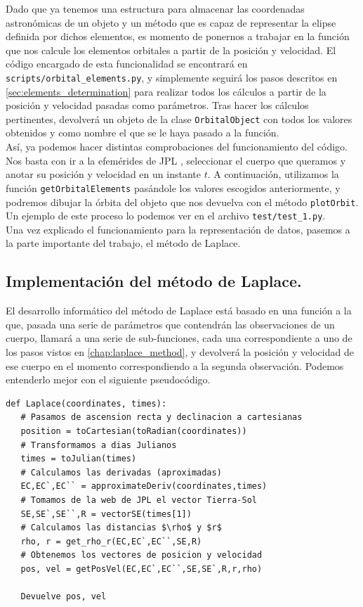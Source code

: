 \documentclass[11pt]{book}
\begin{document}
Dado que ya tenemos una estructura para almacenar las coordenadas astronómicas de un objeto y un método que es capaz de representar la elipse definida por dichos elementos, es momento de ponernos a trabajar en la función que nos calcule los elementos orbitales a partir de la posición y velocidad. El código encargado de esta funcionalidad se encontrará en \texttt{scripts/orbital\_elements.py}, y simplemente seguirá los pasos descritos en \ref{sec:elements_determination} para realizar todos los cálculos a partir de la posición y velocidad pasadas como parámetros. Tras hacer los cálculos pertinentes, devolverá un objeto de la clase \texttt{OrbitalObject} con todos los valores obtenidos y como nombre el que se le haya pasado a la función.\\

Así, ya podemos hacer distintas comprobaciones del funcionamiento del código. Nos basta con ir a la efemérides de JPL \cite{jpl}, seleccionar el cuerpo que queramos y anotar su posición y velocidad en un instante $t$. A continuación, utilizamos la función \texttt{getOrbitalElements} pasándole los valores escogidos anteriormente, y podremos dibujar la órbita del objeto que nos devuelva con el método \texttt{plotOrbit}. Un ejemplo de este proceso lo podemos ver en el archivo \texttt{test/test\_1.py}.\\

Una vez explicado el funcionamiento para la representación de datos, pasemos a la parte importante del trabajo, el método de Laplace.\\

\subsection{Implementación del método de Laplace.}
\label{subsec:laplace_method_code}
El desarrollo informático del método de Laplace está basado en una función a la que, pasada una serie de parámetros que contendrán las observaciones de un cuerpo, llamará a una serie de sub-funciones, cada una correspondiente a uno de los pasos vistos en \ref{chap:laplace_method}, y devolverá la posición y velocidad de ese cuerpo en el momento correspondiendo a la segunda observación. Podemos entenderlo mejor con el siguiente pseudocódigo.
\begin{lstlisting}[style=PythonCode]
def Laplace(coordinates, times):
   # Pasamos de ascension recta y declinacion a cartesianas
   position = toCartesian(toRadian(coordinates))
   # Transformamos a dias Julianos
   times = toJulian(times)
   # Calculamos las derivadas (aproximadas)
   EC,EC`,EC`` = approximateDeriv(coordinates,times)
   # Tomamos de la web de JPL el vector Tierra-Sol
   SE,SE`,SE``,R = vectorSE(times[1])
   # Calculamos las distancias $\rho$ y $r$
   rho, r = get_rho_r(EC,EC`,EC``,SE,R)
   # Obtenemos los vectores de posicion y velocidad
   pos, vel = getPosVel(EC,EC`,EC``,SE,SE`,R,r,rho)
   
   Devuelve pos, vel
\end{lstlisting}
\end{document}
